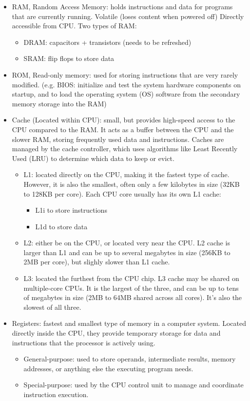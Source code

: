\documentclass[a4paper,12pt]{article}
\begin{document}
\begin{itemize}
    \item RAM, Random Access Memory: holds instructions and data 
for programs that are currently running. Volatile (loses content when powered off) Directly accessible from CPU. Two types of RAM:
	\begin{itemize}
		\item DRAM: capacitors + transistors (needs to be refreshed)
		\item SRAM: flip flops to store data
	\end{itemize}
    \item ROM, Read-only memory: used for storing instructions that are very rarely modified. (e.g. BIOS: initialize and test the system hardware components on startup, and to load the operating system (OS) software from the secondary memory storage into the RAM) 
    \item Cache (Located within CPU): small, but provides high-speed access to the CPU compared to the RAM. It acts as a buffer between the CPU and the slower RAM, storing frequently used data and instructions. Caches are managed by the cache controller, which uses algorithms like Least Recently Used (LRU) to determine which data to keep or evict.
    \begin{itemize}
        \item L1: located directly on the CPU, making it the fastest type of cache. However, it is also the smallest, often only a few kilobytes in size (32KB to 128KB per core). Each CPU core usually has its own L1 cache:
		\begin{itemize}
			\item L1i to store instructions
			\item L1d to store data
		\end{itemize}
        \item L2: either be on the CPU, or located very near the CPU. L2 cache 
is larger than L1 and can be up to several megabytes in size (256KB to 2MB per core), but slighly slower than L1 cache.
        \item L3: located the furthest from the CPU chip. L3 cache may be shared on multiple-core CPUs. It is the largest of the three, and can be up to tens of megabytes in size (2MB to 64MB shared across all cores). It's also the slowest of all three.
    \end{itemize}
	\item Registers: fastest and smallest type of memory in a computer system. Located directly inside the CPU, they provide temporary storage for data and instructions that the processor is actively using.
\begin{itemize}
\item General-purpose: used to store operands, intermediate results, memory addresses, or anything else the executing program needs.
\item Special-purpose: used by the CPU control unit to manage and coordinate instruction execution. 
\end{itemize}
\end{itemize}
\end{document}

